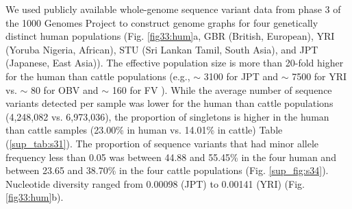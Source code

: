 \documentclass[../main.tex]{subfiles}
\begin{document}
We used publicly available whole-genome sequence variant data from phase 3 of the 1000 Genomes Project \citep{10002015global} to construct genome graphs for four genetically distinct human populations (Fig. \ref{fig33:hum}a, GBR (British, European), YRI (Yoruba Nigeria, African), STU (Sri Lankan Tamil, South Asia), and JPT (Japanese, East Asia)). The effective population size is more than 20-fold higher for the human than cattle populations (e.g., $\sim$ 3100 for JPT and $\sim$ 7500 for YRI \citep{tenesa2007recent} vs. $\sim$ 80 for OBV and $\sim$ 160 for FV \citep{pausch2013imputation,hagger2005estimates}). While the average number of sequence variants detected per sample was lower for the human than cattle populations (4,248,082 vs. 6,973,036), the proportion of singletons is higher in the human than cattle samples (23.00\% in human vs. 14.01\% in cattle) Table (\ref{sup_tab:s31}). The proportion of sequence variants that had minor allele frequency less than 0.05 was between 44.88 and 55.45\% in the four human and between 23.65 and 38.70\% in the four cattle populations (Fig. \ref{sup_fig:s34}). Nucleotide diversity ranged from 0.00098 (JPT) to 0.00141 (YRI) (Fig. \ref{fig33:hum}b).
\end{document}
